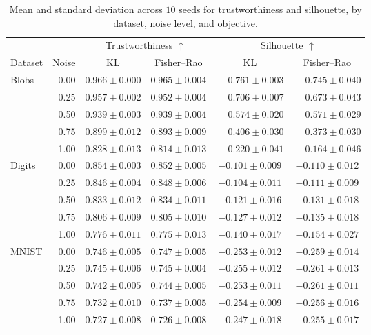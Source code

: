 \documentclass[11pt]{article}
\begin{document}
\begin{table}[t]
  \centering
  \caption{Mean and standard deviation across $10$ seeds for trustworthiness and silhouette,
  by dataset, noise level, and objective.}
  \label{tab:agg-means}
  \scriptsize
  \begin{tabular}{lrcccc}
    \toprule
    & & \multicolumn{2}{c}{Trustworthiness $\uparrow$} & \multicolumn{2}{c}{Silhouette $\uparrow$} \\
    \cmidrule(lr){3-4}\cmidrule(lr){5-6}
    Dataset & Noise & KL & Fisher--Rao & KL & Fisher--Rao \\
    \midrule
    Blobs   & 0.00 & $0.966\pm0.000$ & $0.965\pm0.004$ & $\phantom{-}0.761\pm0.003$ & $\phantom{-}0.745\pm0.040$ \\
            & 0.25 & $0.957\pm0.002$ & $0.952\pm0.004$ & $\phantom{-}0.706\pm0.007$ & $\phantom{-}0.673\pm0.043$ \\
            & 0.50 & $0.939\pm0.003$ & $0.939\pm0.004$ & $\phantom{-}0.574\pm0.020$ & $\phantom{-}0.571\pm0.029$ \\
            & 0.75 & $0.899\pm0.012$ & $0.893\pm0.009$ & $\phantom{-}0.406\pm0.030$ & $\phantom{-}0.373\pm0.030$ \\
            & 1.00 & $0.828\pm0.013$ & $0.814\pm0.013$ & $\phantom{-}0.220\pm0.041$ & $\phantom{-}0.164\pm0.046$ \\
    \midrule
    Digits  & 0.00 & $0.854\pm0.003$ & $0.852\pm0.005$ & $-0.101\pm0.009$ & $-0.110\pm0.012$ \\
            & 0.25 & $0.846\pm0.004$ & $0.848\pm0.006$ & $-0.104\pm0.011$ & $-0.111\pm0.009$ \\
            & 0.50 & $0.833\pm0.012$ & $0.834\pm0.011$ & $-0.121\pm0.016$ & $-0.131\pm0.018$ \\
            & 0.75 & $0.806\pm0.009$ & $0.805\pm0.010$ & $-0.127\pm0.012$ & $-0.135\pm0.018$ \\
            & 1.00 & $0.776\pm0.011$ & $0.775\pm0.013$ & $-0.140\pm0.017$ & $-0.154\pm0.027$ \\
    \midrule
    MNIST   & 0.00 & $0.746\pm0.005$ & $0.747\pm0.005$ & $-0.253\pm0.012$ & $-0.259\pm0.014$ \\
            & 0.25 & $0.745\pm0.006$ & $0.745\pm0.004$ & $-0.255\pm0.012$ & $-0.261\pm0.013$ \\
            & 0.50 & $0.742\pm0.005$ & $0.744\pm0.005$ & $-0.253\pm0.011$ & $-0.261\pm0.011$ \\
            & 0.75 & $0.732\pm0.010$ & $0.737\pm0.005$ & $-0.254\pm0.009$ & $-0.256\pm0.016$ \\
            & 1.00 & $0.727\pm0.008$ & $0.726\pm0.008$ & $-0.247\pm0.018$ & $-0.255\pm0.017$ \\
    \bottomrule
  \end{tabular}
\end{table}
\end{document}
